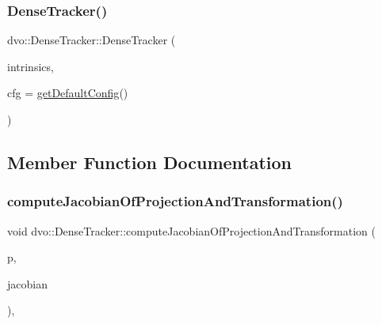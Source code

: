 \subsubsection{\texorpdfstring{Dense\+Tracker()}{DenseTracker()}}
{\footnotesize\ttfamily dvo\+::\+Dense\+Tracker\+::\+Dense\+Tracker (\begin{DoxyParamCaption}\item[{\mbox{\hyperlink{structdvo_1_1core_1_1_intrinsic_matrix}{dvo\+::core\+::\+Intrinsic\+Matrix}} \&}]{intrinsics,  }\item[{const \mbox{\hyperlink{structdvo_1_1_dense_tracker_1_1_config}{Config}} \&}]{cfg = {\ttfamily \mbox{\hyperlink{classdvo_1_1_dense_tracker_a81b87df428095d10a86c996d6f2fc900}{get\+Default\+Config}}()} }\end{DoxyParamCaption})}



\subsection{Member Function Documentation}
\mbox{\label{classdvo_1_1_dense_tracker_a534e6aaf24e6526de76e97b3a73a234c}} 
\subsubsection{\texorpdfstring{compute\+Jacobian\+Of\+Projection\+And\+Transformation()}{computeJacobianOfProjectionAndTransformation()}}
{\footnotesize\ttfamily void dvo\+::\+Dense\+Tracker\+::compute\+Jacobian\+Of\+Projection\+And\+Transformation (\begin{DoxyParamCaption}\item[{const \mbox{\hyperlink{namespacedvo_1_1core_a71fd2291c4d15b2a797ec3a0959d2b6a}{dvo\+::core\+::\+Vector4}} \&}]{p,  }\item[{\mbox{\hyperlink{namespacedvo_1_1core_ac6a9bb149a44f85a33be52a701abfac8}{dvo\+::core\+::\+Matrix2x6}} \&}]{jacobian }\end{DoxyParamCaption})\hspace{0.3cm}{\ttfamily [inline]}, {\ttfamily [static]}}

